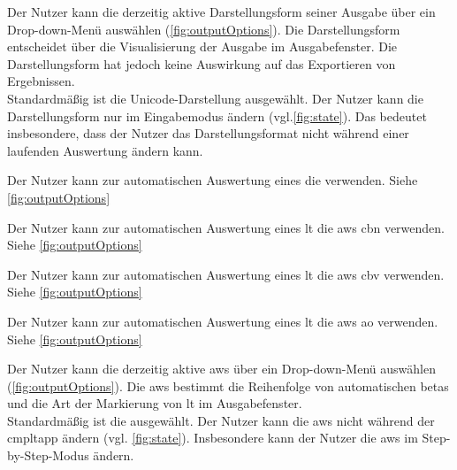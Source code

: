 \documentclass[parskip=full,11pt,twoside]{scrartcl}
\begin{document}
Der Nutzer kann die derzeitig aktive Darstellungsform seiner Ausgabe über ein Drop-down-Menü auswählen (\cref{fig:outputOptions}).
Die Darstellungsform entscheidet über die Visualisierung der Ausgabe im Ausgabefenster. Die Darstellungsform hat jedoch keine Auswirkung auf das Exportieren von Ergebnissen.\\
Standardmäßig ist die Unicode-Darstellung ausgewählt.
Der Nutzer kann die Darstellungsform nur im Eingabemodus ändern (vgl.\cref{fig:state}).
Das bedeutet insbesondere, dass der Nutzer das Darstellungsformat nicht während einer laufenden Auswertung ändern kann.

Der Nutzer kann zur automatischen Auswertung eines  die  verwenden. Siehe \cref{fig:outputOptions}

Der Nutzer kann zur automatischen Auswertung eines \gls{lt} die \gls{aws} \gls{cbn} verwenden. Siehe \cref{fig:outputOptions}

Der Nutzer kann zur automatischen Auswertung eines \gls{lt} die \gls{aws} \gls{cbv} verwenden. Siehe \cref{fig:outputOptions}

Der Nutzer kann zur automatischen Auswertung eines \gls{lt} die \gls{aws} \gls{ao} verwenden. Siehe \cref{fig:outputOptions}

Der Nutzer kann die derzeitig aktive \gls{aws} über ein Drop-down-Menü auswählen (\cref{fig:outputOptions}). 
Die \gls{aws} bestimmt die Reihenfolge von automatischen \glspl{beta} und die Art der Markierung von \gls{lt} im Ausgabefenster.\\
Standardmäßig ist die  ausgewählt. 
Der Nutzer kann die \gls{aws} nicht während der \gls{cmpltapp} ändern (vgl. \cref{fig:state}). 
Insbesondere kann der Nutzer die \gls{aws} im Step-by-Step-Modus ändern.
\end{document}
